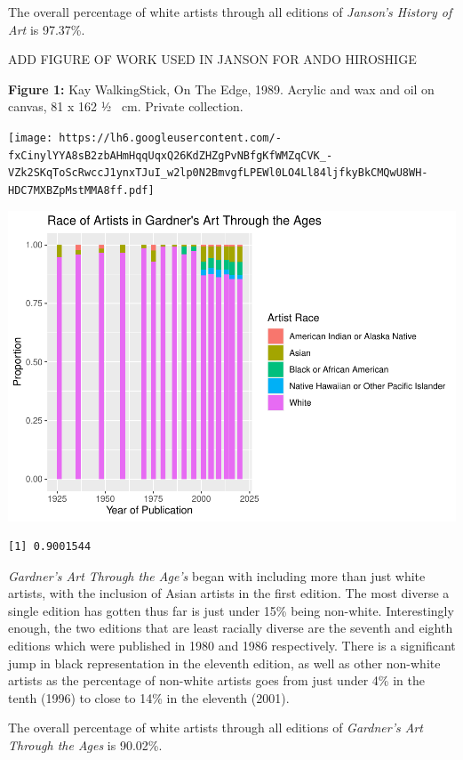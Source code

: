 \documentclass[
  letterpaper,
  DIV=11,
  numbers=noendperiod]{scrreprt}
\begin{document}
The overall percentage of white artists through all editions of
\emph{Janson's History of Art} is 97.37\%.

ADD FIGURE OF WORK USED IN JANSON FOR ANDO HIROSHIGE

\textbf{Figure 1:} Kay WalkingStick, On The Edge, 1989. Acrylic and wax
and oil on canvas, 81 x 162 ½~ cm. Private collection.

\texttt{[image: https://lh6.googleusercontent.com/-fxCinylYYA8sB2zbAHmHqqUqxQ26KdZHZgPvNBfgKfWMZqCVK\_-VZk2SKqToScRwccJ1ynxTJuI\_w2lp0N2BmvgfLPEWl0LO4Ll84ljfkyBkCMQwU8WH-HDC7MXBZpMstMMA8ff.pdf]}

\includegraphics{Chapter1/Chapter1_files/figure-pdf/gardnerracethroughtime-1.pdf}

\begin{verbatim}
[1] 0.9001544
\end{verbatim}

\emph{Gardner's Art Through the Age's} began with including more than
just white artists, with the inclusion of Asian artists in the first
edition. The most diverse a single edition has gotten thus far is just
under 15\% being non-white. Interestingly enough, the two editions that
are least racially diverse are the seventh and eighth editions which
were published in 1980 and 1986 respectively. There is a significant
jump in black representation in the eleventh edition, as well as other
non-white artists as the percentage of non-white artists goes from just
under 4\% in the tenth (1996) to close to 14\% in the eleventh (2001).

The overall percentage of white artists through all editions of
\emph{Gardner's Art Through the Ages} is 90.02\%.
\end{document}
